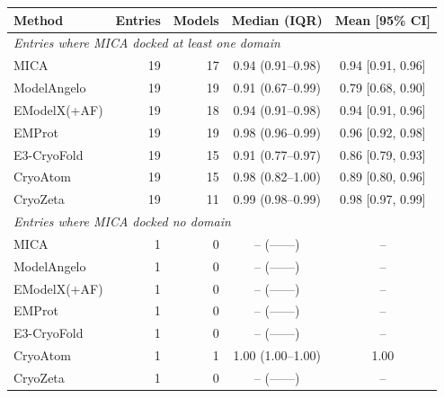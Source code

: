 \begin{tabular}{lrrcc}
\toprule
Method & Entries & Models & Median (IQR) & Mean [95\% CI] \\
\midrule
\multicolumn{5}{l}{\emph{Entries where MICA docked at least one domain}} \\
MICA & 19 & 17 & 0.94 (0.91--0.98) & 0.94 [0.91, 0.96] \\
ModelAngelo & 19 & 19 & 0.91 (0.67--0.99) & 0.79 [0.68, 0.90] \\
EModelX(+AF) & 19 & 18 & 0.94 (0.91--0.98) & 0.94 [0.91, 0.96] \\
EMProt & 19 & 19 & 0.98 (0.96--0.99) & 0.96 [0.92, 0.98] \\
E3-CryoFold & 19 & 15 & 0.91 (0.77--0.97) & 0.86 [0.79, 0.93] \\
CryoAtom & 19 & 15 & 0.98 (0.82--1.00) & 0.89 [0.80, 0.96] \\
CryoZeta & 19 & 11 & 0.99 (0.98--0.99) & 0.98 [0.97, 0.99] \\
\midrule
\multicolumn{5}{l}{\emph{Entries where MICA docked no domain}} \\
MICA & 1 & 0 & -- (------) & --  \\
ModelAngelo & 1 & 0 & -- (------) & --  \\
EModelX(+AF) & 1 & 0 & -- (------) & --  \\
EMProt & 1 & 0 & -- (------) & --  \\
E3-CryoFold & 1 & 0 & -- (------) & --  \\
CryoAtom & 1 & 1 & 1.00 (1.00--1.00) & 1.00  \\
CryoZeta & 1 & 0 & -- (------) & --  \\
\bottomrule
\end{tabular}
